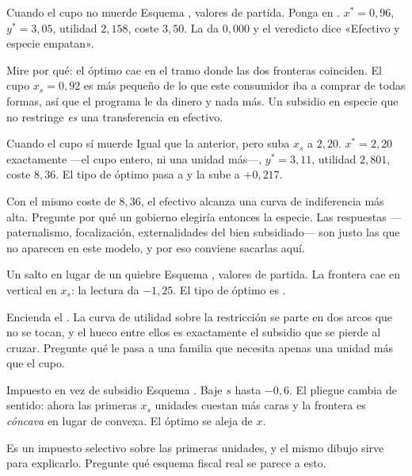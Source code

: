\documentclass[11pt,a4paper]{appletmanual}
\begin{document}
\begin{activity}{Cuando el cupo no muerde}
\amset Esquema , valores de partida.
Ponga  en .
\amexp $x^\ast = 0{,}96$, $y^\ast = 3{,}05$, utilidad $2{,}158$, coste
$3{,}50$. La  da $0{,}000$ y el veredicto dice
«Efectivo y especie empatan».
\par\smallskip
Mire por qué: el óptimo cae en el tramo donde las dos fronteras coinciden. El
cupo $x_s = 0{,}92$ es más pequeño de lo que este consumidor iba a comprar de
todas formas, así que el programa le da dinero y nada más. Un subsidio en
especie que no restringe \emph{es} una transferencia en efectivo.
\end{activity}

\begin{activity}{Cuando el cupo sí muerde}
\amset Igual que la anterior, pero suba $x_s$ a $2{,}20$.
\amexp $x^\ast = 2{,}20$ exactamente —el cupo entero, ni una unidad más—,
$y^\ast = 3{,}11$, utilidad $2{,}801$, coste $8{,}36$. El tipo de óptimo pasa a
 y la  sube a $+0{,}217$.
\par\smallskip
Con el mismo coste de $8{,}36$, el efectivo alcanza una curva de indiferencia
más alta. Pregunte por qué un gobierno elegiría entonces la especie. Las
respuestas —paternalismo, focalización, externalidades del bien subsidiado— son
justo las que no aparecen en este modelo, y por eso conviene sacarlas aquí.
\end{activity}

\begin{activity}{Un salto en lugar de un quiebre}
\amset Esquema , valores de
partida.
\amexp La frontera cae en vertical en $x_s$: la lectura  da
$-1{,}25$. El tipo de óptimo es .
\par\smallskip
Encienda el . La curva de utilidad sobre la
restricción se parte en dos arcos que no se tocan, y el hueco entre ellos es
exactamente el subsidio que se pierde al cruzar. Pregunte qué le pasa a una
familia que necesita apenas una unidad más que el cupo.
\end{activity}

\begin{activity}{Impuesto en vez de subsidio}
\amset Esquema . Baje $s$ hasta $-0{,}6$.
\amexp El pliegue cambia de sentido: ahora las primeras $x_s$ unidades cuestan
más caras y la frontera es \emph{cóncava} en lugar de convexa. El óptimo se
aleja de $x$.
\par\smallskip
Es un impuesto selectivo sobre las primeras unidades, y el mismo dibujo sirve
para explicarlo. Pregunte qué esquema fiscal real se parece a esto.
\end{activity}
\end{document}
